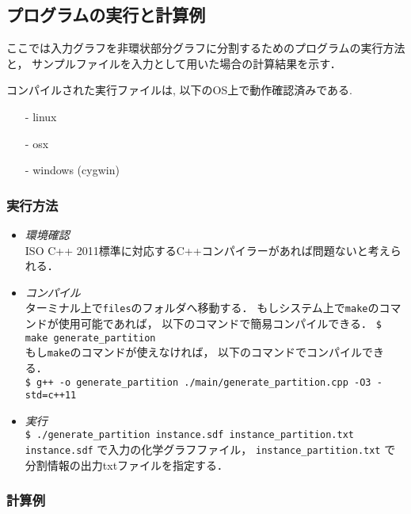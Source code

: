 \documentclass[11pt,titlepage,dvipdfmx,twoside]{jarticle}
\begin{document}

\subsection{プログラムの実行と計算例}
\label{sec:Example_p}

ここでは入力グラフを非環状部分グラフに分割するためのプログラムの実行方法と，
サンプルファイルを入力として用いた場合の計算結果を示す．

コンパイルされた実行ファイルは, 以下のOS上で動作確認済みである.
\begin{itemize}
\item[-] linux
\item[-] osx 
\item[-] windows (cygwin)
\end{itemize}

\subsubsection{実行方法}
\label{sec:compile_p}
\begin{itemize}
	\item {\em 環境確認}\\
		ISO C++ 2011標準に対応するC++コンパイラーがあれば問題ないと考えられる．
	\item {\em コンパイル}\\
	      ターミナル上で{\tt files}のフォルダへ移動する．
	      もしシステム上で{\tt make}のコマンドが使用可能であれば，
	      以下のコマンドで簡易コンパイルできる．
	      \verb|$ make generate_partition|\\
	      もし{\tt make}のコマンドが使えなければ，
	      以下のコマンドでコンパイルできる． \\	
		\verb|$ g++ -o generate_partition ./main/generate_partition.cpp -O3 -std=c++11|
	\item {\em 実行}\\
		\verb|$ ./generate_partition instance.sdf instance_partition.txt|\\
		\verb|instance.sdf| で入力の化学グラフファイル，
	  \verb|instance_partition.txt| で分割情報の出力txtファイルを指定する．
\end{itemize}


\subsubsection{計算例}
\label{sec:instance_p}
\end{document}
